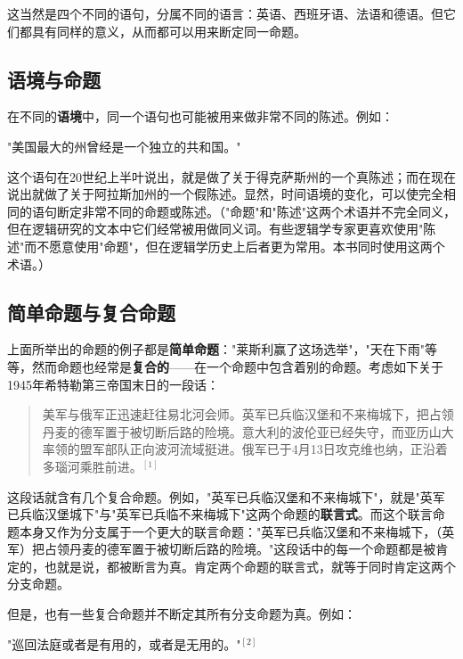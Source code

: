 这当然是四个不同的语句，分属不同的语言：英语、西班牙语、法语和德语。但它们都具有同样的意义，从而都可以用来断定同一命题。

\subsection{语境与命题}

在不同的\textbf{语境}中，同一个语句也可能被用来做非常不同的陈述。例如：

\begin{center}
"美国最大的州曾经是一个独立的共和国。"
\end{center}

这个语句在20世纪上半叶说出，就是做了关于得克萨斯州的一个真陈述；而在现在说出就做了关于阿拉斯加州的一个假陈述。显然，时间语境的变化，可以使完全相同的语句断定非常不同的命题或陈述。（"命题"和"陈述"这两个术语并不完全同义，但在逻辑研究的文本中它们经常被用做同义词。有些逻辑学专家更喜欢使用"陈述"而不愿意使用"命题"，但在逻辑学历史上后者更为常用。本书同时使用这两个术语。）

\subsection{简单命题与复合命题}

上面所举出的命题的例子都是\textbf{简单命题}："莱斯利赢了这场选举"，"天在下雨"等等，然而命题也经常是\textbf{复合的}——在一个命题中包含着别的命题。考虑如下关于1945年希特勒第三帝国末日的一段话：

\begin{quotation}
美军与俄军正迅速赶往易北河会师。英军已兵临汉堡和不来梅城下，把占领丹麦的德军置于被切断后路的险境。意大利的波伦亚已经失守，而亚历山大率领的盟军部队正向波河流域挺进。俄军已于4月13日攻克维也纳，正沿着多瑙河乘胜前进。${}^{[1]}$
\end{quotation}

这段话就含有几个复合命题。例如，"英军已兵临汉堡和不来梅城下"，就是"英军已兵临汉堡城下"与"英军已兵临不来梅城下"这两个命题的\textbf{联言式}。而这个联言命题本身又作为分支属于一个更大的联言命题："英军已兵临汉堡和不来梅城下，（英军）把占领丹麦的德军置于被切断后路的险境。"这段话中的每一个命题都是被肯定的，也就是说，都被断言为真。肯定两个命题的联言式，就等于同时肯定这两个分支命题。

但是，也有一些复合命题并不断定其所有分支命题为真。例如：

\begin{center}
"巡回法庭或者是有用的，或者是无用的。"${}^{[2]}$
\end{center}

